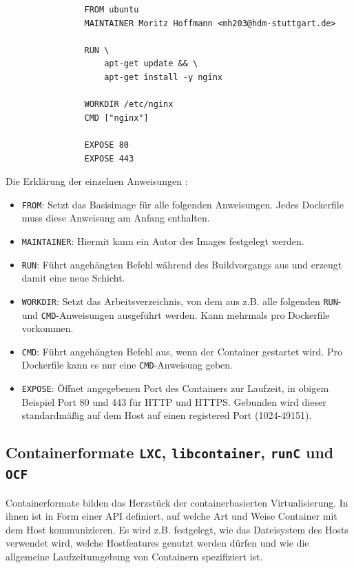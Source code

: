 \documentclass[../main.tex]{subfiles}
\begin{document}
			\begin{lstlisting}
				FROM ubuntu
				MAINTAINER Moritz Hoffmann <mh203@hdm-stuttgart.de>

				RUN \
					apt-get update && \
					apt-get install -y nginx

				WORKDIR /etc/nginx
				CMD ["nginx"]

				EXPOSE 80
				EXPOSE 443
			\end{lstlisting}

			Die Erklärung der einzelnen Anweisungen \cite{dockerDockerfileDocs}:

			\begin{itemize}
				\item \texttt{FROM}: Setzt das Basisimage für alle folgenden Anweisungen. Jedes Dockerfile muss diese Anweisung am Anfang enthalten.
				\item \texttt{MAINTAINER}: Hiermit kann ein Autor des Images festgelegt werden.
				\item \texttt{RUN}: Führt angehängten Befehl während des \gls{Build}vorgangs aus und erzeugt damit eine neue Schicht.
				\item \texttt{WORKDIR}: Setzt das Arbeitsverzeichnis, von dem aus z.B. alle folgenden \texttt{RUN}- und \texttt{CMD}-Anweisungen ausgeführt werden. Kann mehrmals pro Dockerfile vorkommen.
				\item \texttt{CMD}: Führt angehängten Befehl aus, wenn der Container gestartet wird. Pro Dockerfile kann es nur eine \texttt{CMD}-Anweisung geben.
				\item \texttt{EXPOSE}: Öffnet angegebenen Port des Containers zur Laufzeit, in obigem Beispiel Port 80 und 443 für \acrshort{HTTP} und \acrshort{HTTPS}. Gebunden wird dieser standardmäßig auf dem Host auf einen \glqq{}registered\grqq{} Port (1024-49151).
			\end{itemize}

		\subsection{Containerformate \texttt{LXC}, \texttt{libcontainer}, \texttt{runC} und \texttt{OCF}}
		\label{dockerContainerformate}
			Containerformate bilden das Herzstück der containerbasierten Virtualisierung. In ihnen ist in Form einer \acrshort{API} definiert, auf welche Art und Weise Container mit dem Host kommunizieren. Es wird z.B. festgelegt, wie das Dateisystem des Hosts verwendet wird, welche Hostfeatures genutzt werden dürfen und wie die allgemeine Laufzeitumgebung von Containern spezifiziert ist.
\end{document}
